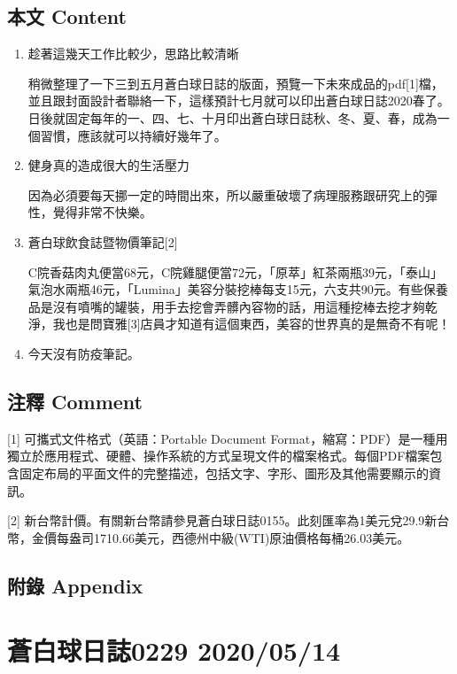\documentclass[a5paper, 11pt
]{book}
\begin{document}
\hypertarget{ux672cux6587-content-73}{%
\subsection{本文 Content}\label{ux672cux6587-content-73}}

\begin{enumerate}
\def\labelenumi{\arabic{enumi}.}
\item
  趁著這幾天工作比較少，思路比較清晰

  稍微整理了一下三到五月蒼白球日誌的版面，預覽一下未來成品的pdf{[}1{]}檔，並且跟封面設計者聯絡一下，這樣預計七月就可以印出蒼白球日誌2020春了。日後就固定每年的一、四、七、十月印出蒼白球日誌秋、冬、夏、春，成為一個習慣，應該就可以持續好幾年了。
\item
  健身真的造成很大的生活壓力

  因為必須要每天挪一定的時間出來，所以嚴重破壞了病理服務跟研究上的彈性，覺得非常不快樂。
\item
  蒼白球飲食誌暨物價筆記{[}2{]}

  C院香菇肉丸便當68元，C院雞腿便當72元，「原萃」紅茶兩瓶39元，「泰山」氣泡水兩瓶46元，「Lumina」美容分裝挖棒每支15元，六支共90元。有些保養品是沒有噴嘴的罐裝，用手去挖會弄髒內容物的話，用這種挖棒去挖才夠乾淨，我也是問寶雅{[}3{]}店員才知道有這個東西，美容的世界真的是無奇不有呢！
\item
  今天沒有防疫筆記。
\end{enumerate}

\hypertarget{ux6ce8ux91cb-comment-73}{%
\subsection{注釋 Comment}\label{ux6ce8ux91cb-comment-73}}

{[}1{]} 可攜式文件格式（英語：Portable Document
Format，縮寫：PDF）是一種用獨立於應用程式、硬體、操作系統的方式呈現文件的檔案格式。每個PDF檔案包含固定布局的平面文件的完整描述，包括文字、字形、圖形及其他需要顯示的資訊。

{[}2{]}
新台幣計價。有關新台幣請參見蒼白球日誌0155。此刻匯率為1美元兌29.9新台幣，金價每盎司1710.66美元，西德州中級(WTI)原油價格每桶26.03美元。

\hypertarget{ux9644ux9304-appendix-73}{%
\subsection{附錄 Appendix}\label{ux9644ux9304-appendix-73}}

\hypertarget{ux84bcux767dux7403ux65e5ux8a8c0229-20200514}{%
\section{蒼白球日誌0229
2020/05/14}\label{ux84bcux767dux7403ux65e5ux8a8c0229-20200514}}
\end{document}
